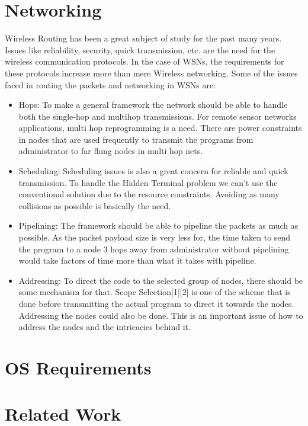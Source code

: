 \documentclass[twocolumn]{article}
\begin{document}
\section{Networking}

Wireless Routing has been a great subject of study for the past many years. Issues like reliability, security, quick transmission, etc. are the need for the wireless communication protocols. In the case of WSNs, the requirements for these protocols increase more than mere Wireless networking. Some of the issues faced in routing the packets and networking in WSNs are:
\begin{itemize}
\item Hops: To make a general framework the network should be able to handle both the single-hop and multihop transmissions. For remote sensor networks applications, multi hop reprogramming is a need. There are power constraints in nodes that are used frequently to transmit the programs from administrator to far flung nodes in multi hop nets.

\item Scheduling: Scheduling issues is also a great concern for reliable and quick transmission. To handle the Hidden Terminal problem we can’t use the conventional solution due to the resource constraints. Avoiding as many collisions as possible is basically the need.

\item Pipelining: The framework should be able to pipeline the packets as much as possible. As the packet payload size is very less for, the time taken to send the program to a node 3 hops away from administrator without pipelining would take factors of time more than what it takes with pipeline.

\item Addressing: To direct the code to the selected group of nodes, there should be some mechanism for that. Scope Selection[1][2] is one of the scheme that is done before transmitting the actual program to direct it towards the nodes. Addressing the nodes could also be done. This is an important issue of how to address the nodes and the intricacies behind it.
\end{itemize}

\section{OS Requirements}



\section{Related Work}
\end{document}
